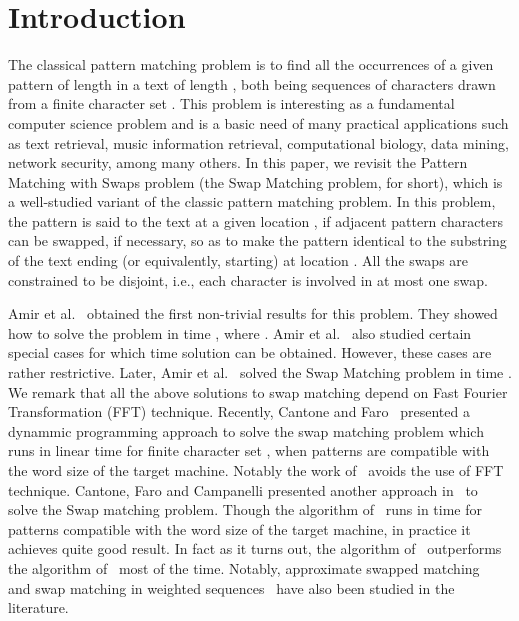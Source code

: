 \documentclass{llncs}
\begin{document}
\section{\label{intro}Introduction}
The classical pattern matching problem is to find all the occurrences of a given pattern  of length  in a text  of length , both being sequences of characters drawn from a finite character set . This problem is interesting as a fundamental computer science problem and is a basic need of many practical applications such as text retrieval, music information retrieval, computational biology, data mining, network security, among many others. In this paper, we revisit the Pattern Matching with Swaps problem (the Swap Matching problem, for short), which is a well-studied variant of the classic pattern matching problem. In this problem, the pattern  is said to  the text  at a given location , if adjacent pattern characters can be swapped, if necessary, so as to make the pattern identical to the substring of the text ending (or equivalently, starting) at location . All the swaps are constrained to be disjoint, i.e., each character is involved in at most one swap. 


Amir et al.~\cite{DBLP:journals/jal/AmirALLL00} obtained the first non-trivial results for this problem. They showed how to solve the problem in time , where . Amir et al.~\cite{DBLP:journals/ipl/AmirLLL98} also studied certain special cases for which  time solution can be obtained. However, these cases are rather restrictive. Later, Amir et al.~\cite{DBLP:journals/iandc/AmirCHLP03} solved the Swap Matching problem in time . We remark that all the above solutions to swap matching depend on Fast Fourier Transformation (FFT) technique. Recently, Cantone and Faro~\cite{CS} presented a dynammic programming approach to solve the swap matching problem which runs in linear time for finite character set , when patterns are compatible with the word size of the target machine. Notably the work of~\cite{CS} avoids the use of FFT technique. Cantone, Faro and Campanelli presented another approach in~\cite{CCS} to solve the Swap matching problem. Though the algorithm of~\cite{CCS} runs in  time for patterns compatible with the word size of the target machine, in practice it achieves quite good result. In fact as it turns out, the algorithm of~\cite{CCS} outperforms the algorithm of~\cite{CS} most of the time.  
Notably, approximate swapped matching~\cite{DBLP:journals/ipl/AmirLP02} and swap matching in weighted sequences~\cite{DBLP:conf/cis/ZhangGI04} have also been studied in the literature.
\end{document}
